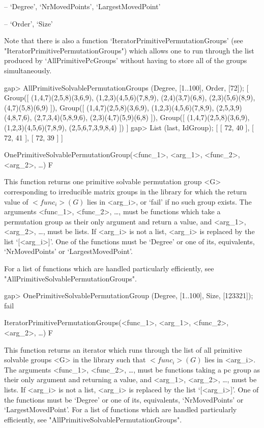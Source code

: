 \beginlist

\item{--} `Degree', `NrMovedPoints', `LargestMovedPoint'
\item{--} `Order', `Size'
\endlist

Note that there is also a function `IteratorPrimitivePermutationGroups' (see
"IteratorPrimitivePermutationGroups") which allows one to run through the list produced by
`AllPrimitivePcGroups' without having to store all of the groups
simultaneously.

\beginexample
gap> AllPrimitiveSolvablePermutationGroups (Degree, [1..100], Order, [72]);
[ Group([ (1,4,7)(2,5,8)(3,6,9), (1,2,3)(4,5,6)(7,8,9), (2,4)(3,7)(6,8), 
      (2,3)(5,6)(8,9), (4,7)(5,8)(6,9) ]), 
  Group([ (1,4,7)(2,5,8)(3,6,9), (1,2,3)(4,5,6)(7,8,9), (2,5,3,9)(4,8,7,6), 
      (2,7,3,4)(5,8,9,6), (2,3)(4,7)(5,9)(6,8) ]), 
  Group([ (1,4,7)(2,5,8)(3,6,9), (1,2,3)(4,5,6)(7,8,9), (2,5,6,7,3,9,8,4) ]) ]
gap> List (last, IdGroup);
[ [ 72, 40 ], [ 72, 41 ], [ 72, 39 ] ]
\endexample


\>OnePrimitiveSolvablePermutationGroup(<func_1>, <arg_1>, <func_2>, <arg_2>, \dots) F

This function returns one primitive solvable permutation
group <G> corresponding to irreducible matrix groups in the  {\IRREDSOL} library 
for which the return value of $<func_i>(G)$ lies in
<arg_i>, or `fail' if no such group exists.  The arguments <func_1>, <func_2>, \dots,
must be {\GAP} functions which take a permutation group as their only argument and return a
value, and <arg_1>, <arg_2>,
\dots,  must be lists. If <arg_i> is not a list, <arg_i> is replaced by the list
`[<arg_i>]'. One of the functions must be `Degree' or one of its, equivalents, `NrMovedPoints' or `LargestMovedPoint'.

For a list of functions which are handled particularly efficiently, see
"AllPrimitiveSolvablePermutationGroups".

\beginexample
gap> OnePrimitiveSolvablePermutationGroup (Degree, [1..100], Size, [123321]);
fail
\endexample

\>IteratorPrimitivePermutationGroups(<func_1>, <arg_1>, <func_2>, <arg_2>, \dots) F

This function returns an iterator which runs through the list of all primitive solvable
groups <G> in the  {\IRREDSOL} library such that
$<func_i>(G)$ lies in <arg_i>. The arguments <func_1>, <func_2>, \dots,
must be {\GAP} functions taking a pc group as their only argument and returning 
a value, and <arg_1>, <arg_2>, \dots, 
must be lists. If <arg_i> is not a list, <arg_i> is replaced by the list `[<arg_i>]'.
One of the functions must be `Degree' or one of its, equivalents, `NrMovedPoints' 
or `LargestMovedPoint'.
For a list of functions which are handled particularly efficiently, see
"AllPrimitiveSolvablePermutationGroups".

